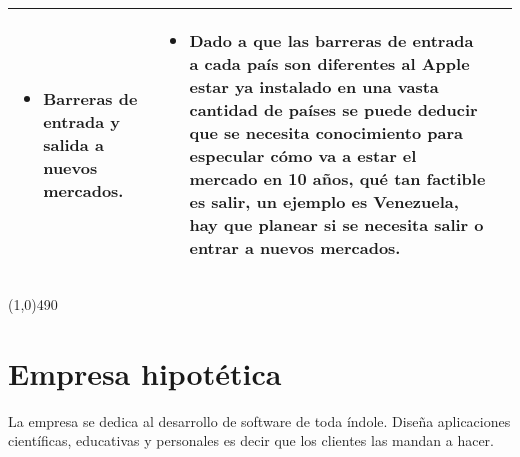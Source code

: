 \documentclass{article}
\begin{document}
\begin{center}
\begin{tabular}{ |p{4cm}|p{4cm}|p{8cm}| }
\begin{itemize}
                \item Barreras de entrada y salida a nuevos mercados.
            \end{itemize}
            & 
            \begin{itemize}
                \item Dado a que las barreras de entrada a cada país son diferentes al Apple estar ya instalado en una vasta cantidad de países se puede deducir que se necesita conocimiento para especular cómo va a estar el mercado en 10 años, qué tan factible es salir, un ejemplo es Venezuela, hay que planear si se necesita salir o entrar a nuevos mercados.
            \end{itemize}
            \\ 
        \hline
    \end{tabular}
\end{center}

\begin{center}
\line(1,0){490}
\end{center}
\section{Empresa hipotética}
La empresa se dedica al desarrollo de software de toda índole. Diseña aplicaciones científicas, educativas y personales es decir que los clientes las mandan a hacer.

\end{document}
